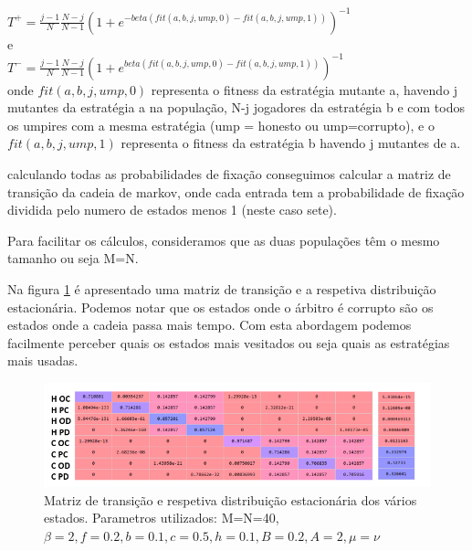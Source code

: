 \documentclass[conference, twocolumn]{IEEEtran}
\theoremstyle{plain}
\theoremstyle{definition}
\theoremstyle{remark}
\begin{document}
    $T^{+}=\frac{j-1}{N}\frac{N-j}{N-1}{(1+e^{-beta(fit(a,b,j,ump,0)-fit(a,b, j,ump,1))})}^{-1}$\\
    e \\

    $T^{-}=\frac{j-1}{N}\frac{N-j}{N-1}{(1+e^{beta(fit(a,b,j,ump,0)-fit(a,b,j,ump,1))})}^{-1}$\\

    onde $fit(a, b, j, ump, 0)$ representa o fitness da estratégia mutante a, havendo j mutantes da estratégia a na população, N-j jogadores da estratégia b e com todos os umpires com a mesma estratégia (ump = honesto ou ump=corrupto), e o $fit(a,b,j, ump, 1)$ representa o fitness da estratégia b havendo j mutantes de a.

    calculando todas as probabilidades de fixação conseguimos calcular a matriz de transição da cadeia de markov, onde cada entrada tem a probabilidade de fixação dividida pelo numero de estados menos 1 (neste caso sete).

    Para facilitar os cálculos, consideramos que as duas populações têm o mesmo tamanho ou seja M=N.

    Na figura \ref{fig:primeira} é apresentado uma matriz de transição e a respetiva distribuição estacionária. Podemos notar que os estados onde o árbitro é corrupto são os estados onde a cadeia passa mais tempo.
    Com esta abordagem podemos facilmente perceber quais os estados mais vesitados ou seja quais as estratégias mais usadas.

    \begin{figure}[h]
        \centering
        \includegraphics[width=1\linewidth]{images/PRIMEIRA.PNG}
        \caption{\small Matriz de transição e respetiva distribuição estacionária dos vários estados. Parametros utilizados: M=N=40, $\beta=2, f=0.2, b=0.1, c=0.5, h=0.1, B=0.2,A=2, \mu=\nu$ }
        \label{fig:primeira}
    \end{figure}

    \newpage
\end{document}
